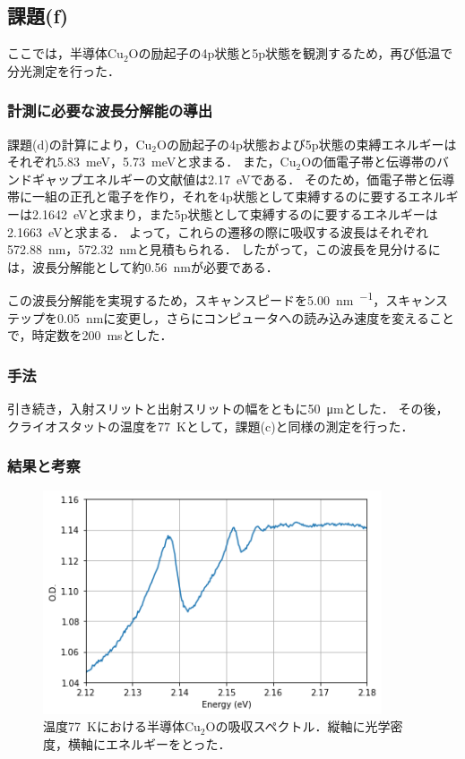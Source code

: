 \documentclass[titlepage]{jsarticle}
\begin{document}
\subsection{課題(f)}
ここでは，半導体Cu$_2$Oの励起子の4p状態と5p状態を観測するため，再び低温で分光測定を行った．

\subsubsection{計測に必要な波長分解能の導出}
課題(d)の計算により，Cu$_2$Oの励起子の4p状態および5p状態の束縛エネルギーはそれぞれ\SI{5.83}{\meV}，\SI{5.73}{\meV}と求まる．
また，Cu$_2$Oの価電子帯と伝導帯のバンドギャップエネルギーの文献値は\SI{2.17}{\eV}である．
そのため，価電子帯と伝導帯に一組の正孔と電子を作り，それを4p状態として束縛するのに要するエネルギーは\SI{2.1642}{\eV}と求まり，また5p状態として束縛するのに要するエネルギーは\SI{2.1663}{\eV}と求まる．
よって，これらの遷移の際に吸収する波長はそれぞれ\SI{572.88}{\nm}，\SI{572.32}{\nm}と見積もられる．
したがって，この波長を見分けるには，波長分解能として約\SI{0.56}{\nm}が必要である．

この波長分解能を実現するため，スキャンスピードを\SI{5.00}{\nm\per\min}，スキャンステップを\SI{0.05}{\nm}に変更し，さらにコンピュータへの読み込み速度を変えることで，時定数を\SI{200}{\ms}とした．

\subsubsection{手法}
引き続き，入射スリットと出射スリットの幅をともに\SI{50}{\um}とした．
その後，クライオスタットの温度を\SI{77}{\kelvin}として，課題(c)と同様の測定を行った．

\subsubsection{結果と考察}

\begin{figure}[htbp]
  \centering
  \includegraphics[width=10cm]{Cu2O_4p5p.png}
  \caption{温度\SI{77}{\kelvin}における半導体Cu$_2$Oの吸収スペクトル．縦軸に光学密度，横軸にエネルギーをとった．}
  \label{fig:Cu2O_4p5p}
\end{figure}
\end{document}
